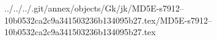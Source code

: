 ../../../.git/annex/objects/Gk/jk/MD5E-s7912--10b0532ca2c9a341503236b134095b27.tex/MD5E-s7912--10b0532ca2c9a341503236b134095b27.tex